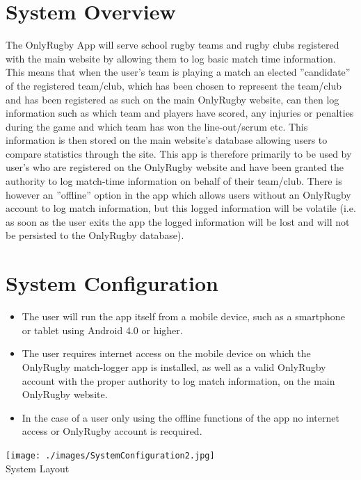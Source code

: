 \documentclass[hidelinks,a4paper,12pt]{article}
\begin{document}
\section{System Overview} 
The OnlyRugby App will serve school rugby teams and rugby clubs registered with the main website by allowing them to log basic match time information. This means that when the user's team is playing a match an elected ''candidate'' of the registered team/club, which has been chosen to represent the team/club and has been registered as such on the main OnlyRugby website, can then log information such as which team and players have scored, any injuries or penalties during the game and which team has won the line-out/scrum etc. This information is then stored on the main website's database allowing users to compare statistics through the site. This app is therefore primarily to be used by user's who are registered on the OnlyRugby website and have been granted the authority to log match-time information on behalf of their team/club. There is however an ''offline'' option in the app which allows users without an OnlyRugby account to log match information, but this logged information will be volatile (i.e. as soon as the user exits the app the logged information will be lost and will not be persisted to the OnlyRugby database).
\section{System Configuration}
\begin {itemize}
	\item The user will run the app itself from a mobile device, such as a smartphone or tablet using Android 4.0 or higher.
	\item The user requires internet access on the mobile device on which the OnlyRugby match-logger app is installed, as well as a valid OnlyRugby account with the proper authority to log match information, on the main OnlyRugby website.
	\item In the case of a user only using the offline functions of the app no internet access or OnlyRugby account is recquired.
\end{itemize}
\begin{center}
  	 \texttt{[image: ./images/SystemConfiguration2.jpg]}\\[0.4cm]
  	 \caption{System Layout}
\end{center}
\end{document}
